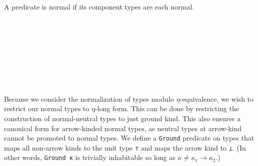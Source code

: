 \documentclass[authoryear, acmsmall, screen, review, nonacm]{acmart}
\begin{document}
A predicate is normal if its component types are each normal.

\begin{code}%
\>[0]\AgdaSpace{}%
\AgdaSpace{}%
\AgdaSpace{}%
\<%
\\
\>[0][@{}l@{\AgdaIndent{0}}]%
\>[2]\AgdaSpace{}%
\AgdaSymbol{:}\<%
\\
\>[2][@{}l@{\AgdaIndent{0}}]%
\>[4]\AgdaSymbol{(}\AgdaSpace{}%
\AgdaSpace{}%
\AgdaSpace{}%
\AgdaSymbol{:}\AgdaSpace{}%
\AgdaSpace{}%
\AgdaSpace{}%
\AgdaOperator{\AgdaInductiveConstructor{R[}}\AgdaSpace{}%
\AgdaSpace{}%
\AgdaOperator{\AgdaInductiveConstructor{]}}\AgdaSymbol{)}\AgdaSpace{}%
\<%
\\
%
\>[4]\AgdaSpace{}%
\AgdaSpace{}%
\AgdaOperator{\AgdaInductiveConstructor{R[}}\AgdaSpace{}%
\AgdaSpace{}%
\AgdaOperator{\AgdaInductiveConstructor{]}}\<%
\\
%
\\[\AgdaEmptyExtraSkip]%
%
\>[2]\AgdaSpace{}%
\AgdaSymbol{:}\<%
\\
\>[2][@{}l@{\AgdaIndent{0}}]%
\>[4]\AgdaSymbol{(}\AgdaSpace{}%
\AgdaSpace{}%
\AgdaSymbol{:}\AgdaSpace{}%
\AgdaSpace{}%
\AgdaSpace{}%
\AgdaOperator{\AgdaInductiveConstructor{R[}}\AgdaSpace{}%
\AgdaSpace{}%
\AgdaOperator{\AgdaInductiveConstructor{]}}\AgdaSymbol{)}\AgdaSpace{}%
\<%
\\
%
\>[4]\AgdaSpace{}%
\AgdaSpace{}%
\AgdaOperator{\AgdaInductiveConstructor{R[}}\AgdaSpace{}%
\AgdaSpace{}%
\AgdaOperator{\AgdaInductiveConstructor{]}}\<%
\end{code}

Because we consider the normalization of types modulo $\eta$-equivalence, we wish to restrict our normal types to $\eta$-long form. This can be done by restricting the construction of normal-neutral types to just ground kind.  This also ensures a canonical form for arrow-kinded normal types, as neutral types at arrow-kind cannot be promoted to normal types. We define a \verb!Ground! predicate on types that maps all non-arrow kinds to the unit type \verb!⊤! and maps the arrow kind to \verb!⊥!. (In other words, \verb!Ground κ! is trivially inhabitable so long as $\kappa \neq \kappa_1 \to \kappa_2$.)
\end{document}
